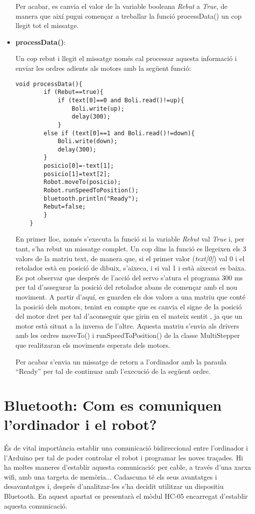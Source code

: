 \begin{itemize}
	Per acabar, es canvia el valor de la variable booleana \emph{Rebut} a \emph{True}, de manera que així pugui començar a treballar la funció processData() un cop llegit tot el missatge. 
	
	\item \textbf{processData()}:
	
	Un cop rebut i llegit el missatge només cal processar aquesta informació i enviar les ordres adients als motors amb la següent funció:
	
	\begin{lstlisting}[style=Arduino]
	void processData(){
		if (Rebut==true){
			if (text[0]==0 and Boli.read()!=up){
				Boli.write(up);
				delay(300);
			}
		else if (text[0]==1 and Boli.read()!=down){
			Boli.write(down);
			delay(300);
		}
		posicio[0]=-text[1];
		posicio[1]=text[2];
		Robot.moveTo(posicio);
		Robot.runSpeedToPosition();
		bluetooth.println("Ready");
		Rebut=false; 
		}
	}
	\end{lstlisting}
	
	En primer lloc, només s’executa la funció si la variable \emph{Rebut} val \emph{True} i, per tant, s’ha rebut un missatge complet. Un cop dins la funció es llegeixen els 3 valors de la matriu text, de manera que, si el primer valor (\emph{text[0]}) val 0 i el retolador està en posició de dibuix, s’aixeca, i si val 1 i està aixecat es baixa. Es pot observar que després de l’acció del servo s’atura el programa 300 ms per tal d’assegurar la posició del retolador abans de començar amb el nou moviment. A partir d’aquí, es guarden els dos valors a una matriu que conté la posició dels motors, tenint en compte que es canvia el signe de la posició del motor dret per tal d’aconseguir que girin en el mateix sentit , ja que un motor està situat a la inversa de l’altre. Aquesta matriu s’envia als drivers amb les ordres moveTo() i runSpeedToPosition() de la classe MultiStepper que realitzaran els moviments esperats dels motors. 
	
	Per acabar s’envia un missatge de retorn a l’ordinador amb la paraula “Ready” per tal de continuar amb l’execució de la següent ordre. 
	
	
\end{itemize}

\section{Bluetooth: Com es comuniquen l'ordinador i el robot?}

És de vital importància establir una comunicació bidireccional entre l’ordinador i l’Arduino per tal de poder controlar el robot i programar les noves traçades. Hi ha moltes maneres d’establir aquesta comunicació: per cable, a través d’una xarxa wifi, amb una targeta de memòria... Cadascuna té els seus avantatges i desavantatges i, després d’analitzar-les s’ha decidit utilitzar un dispositiu Bluetooth. En aquest apartat es presentarà el mòdul HC-05 encarregat d’establir aquesta comunicació.


